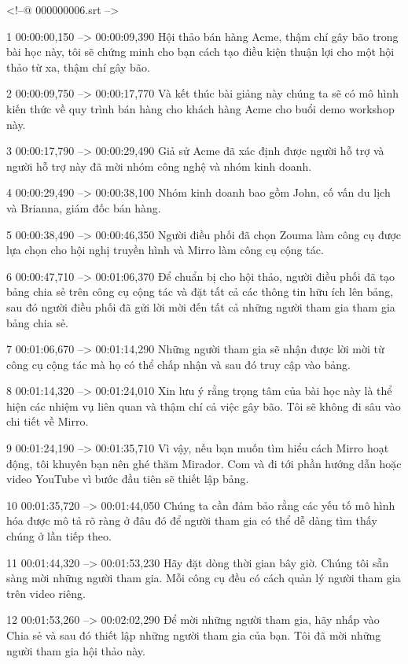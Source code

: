 <!--@ 000000006.srt -->

1
00:00:00,150 --> 00:00:09,390
Hội thảo bán hàng Acme, thậm chí gây bão trong bài học này, tôi sẽ chứng minh cho bạn cách tạo điều kiện thuận lợi cho một hội thảo từ xa, thậm chí gây bão.

2
00:00:09,750 --> 00:00:17,770
Và kết thúc bài giảng này chúng ta sẽ có mô hình kiến ​​thức về quy trình bán hàng cho khách hàng Acme cho buổi demo workshop này.

3
00:00:17,790 --> 00:00:29,490
Giả sử Acme đã xác định được người hỗ trợ và người hỗ trợ này đã mời nhóm công nghệ và nhóm kinh doanh.

4
00:00:29,490 --> 00:00:38,100
Nhóm kinh doanh bao gồm John, cố vấn du lịch và Brianna, giám đốc bán hàng.

5
00:00:38,490 --> 00:00:46,350
Người điều phối đã chọn Zouma làm công cụ được lựa chọn cho hội nghị truyền hình và Mirro làm công cụ cộng tác.

6
00:00:47,710 --> 00:01:06,370
Để chuẩn bị cho hội thảo, người điều phối đã tạo bảng chia sẻ trên công cụ cộng tác và đặt tất cả các thông tin hữu ích lên bảng, sau đó người điều phối đã gửi lời mời đến tất cả những người tham gia tham gia bảng chia sẻ.

7
00:01:06,670 --> 00:01:14,290
Những người tham gia sẽ nhận được lời mời từ công cụ cộng tác mà họ có thể chấp nhận và sau đó truy cập vào bảng.

8
00:01:14,320 --> 00:01:24,010
Xin lưu ý rằng trọng tâm của bài học này là thể hiện các nhiệm vụ liên quan và thậm chí cả việc gây bão.  Tôi sẽ không đi sâu vào chi tiết về Mirro.

9
00:01:24,190 --> 00:01:35,710
Vì vậy, nếu bạn muốn tìm hiểu cách Mirro hoạt động, tôi khuyên bạn nên ghé thăm Mirador.  Com và đi tới phần hướng dẫn hoặc video YouTube vì bước đầu tiên sẽ thiết lập bảng.

10
00:01:35,720 --> 00:01:44,050
Chúng ta cần đảm bảo rằng các yếu tố mô hình hóa được mô tả rõ ràng ở đâu đó để người tham gia có thể dễ dàng tìm thấy chúng ở lần tiếp theo.

11
00:01:44,320 --> 00:01:53,230
Hãy đặt dòng thời gian bây giờ.  Chúng tôi sẵn sàng mời những người tham gia.  Mỗi công cụ đều có cách quản lý người tham gia trên video riêng.

12
00:01:53,260 --> 00:02:02,290
Để mời những người tham gia, hãy nhấp vào Chia sẻ và sau đó thiết lập những người tham gia của bạn.  Tôi đã mời những người tham gia hội thảo này.


